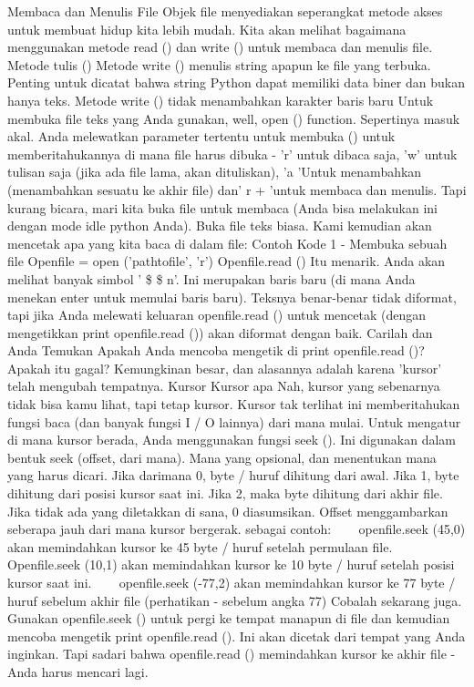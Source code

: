 Membaca dan Menulis File 
Objek file menyediakan seperangkat metode akses untuk membuat hidup kita lebih mudah. Kita akan melihat bagaimana menggunakan metode read () dan write () untuk membaca dan menulis file. Metode tulis () Metode write () menulis string apapun ke file yang terbuka. Penting untuk dicatat bahwa string Python dapat memiliki data biner dan bukan hanya teks. Metode write () tidak menambahkan karakter baris baru 
Untuk membuka file teks yang Anda gunakan, well, open () function. Sepertinya masuk akal. Anda melewatkan parameter tertentu untuk membuka () untuk memberitahukannya di mana file harus dibuka - 'r' untuk dibaca saja, 'w' untuk tulisan saja (jika ada file lama, akan dituliskan), 'a 'Untuk menambahkan (menambahkan sesuatu ke akhir file) dan' r + 'untuk membaca dan menulis. Tapi kurang bicara, mari kita buka file untuk membaca (Anda bisa melakukan ini dengan mode idle python Anda). Buka file teks biasa. Kami kemudian akan mencetak apa yang kita baca di dalam file: 
Contoh Kode 1 - Membuka sebuah file  
Openfile = open ('pathtofile', 'r') 
Openfile.read ()
Itu menarik. Anda akan melihat banyak simbol ' \$  \setminus  \$ n'. Ini merupakan baris baru (di mana Anda menekan enter untuk memulai baris baru). Teksnya benar-benar tidak diformat, tapi jika Anda melewati keluaran openfile.read () untuk mencetak (dengan mengetikkan print openfile.read ()) akan diformat dengan baik. Carilah dan Anda Temukan Apakah Anda mencoba mengetik di print openfile.read ()? Apakah itu gagal? Kemungkinan besar, dan alasannya adalah karena 'kursor' telah mengubah tempatnya. Kursor Kursor apa Nah, kursor yang sebenarnya tidak bisa kamu lihat, tapi tetap kursor. Kursor tak terlihat ini memberitahukan fungsi baca (dan banyak fungsi I / O lainnya) dari mana mulai. Untuk mengatur di mana kursor berada, Anda menggunakan fungsi seek (). Ini digunakan dalam bentuk seek (offset, dari mana). Mana yang opsional, dan menentukan mana yang harus dicari. Jika darimana 0, byte / huruf dihitung dari awal. Jika 1, byte dihitung dari posisi kursor saat ini. Jika 2, maka byte dihitung dari akhir file. Jika tidak ada yang diletakkan di sana, 0 diasumsikan.  
Offset menggambarkan seberapa jauh dari mana kursor bergerak. sebagai contoh: 
~~~ openfile.seek (45,0) akan memindahkan kursor ke 45 byte / huruf setelah permulaan file. 
~~~ Openfile.seek (10,1) akan memindahkan kursor ke 10 byte / huruf setelah posisi kursor saat ini.  
~~~ openfile.seek (-77,2) akan memindahkan kursor ke 77 byte / huruf sebelum akhir file (perhatikan - sebelum angka 77) 
Cobalah sekarang juga. Gunakan openfile.seek () untuk pergi ke tempat manapun di file dan kemudian mencoba mengetik print openfile.read (). Ini akan dicetak dari tempat yang Anda inginkan. Tapi sadari bahwa openfile.read () memindahkan kursor ke akhir file - Anda harus mencari lagi.  
